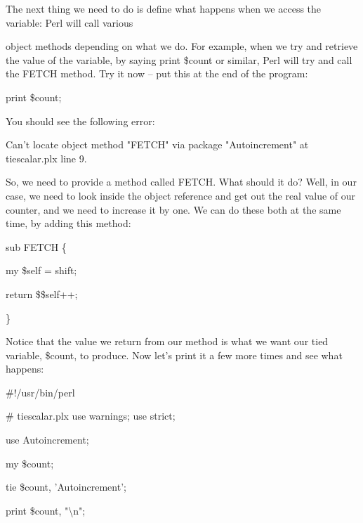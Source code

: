 \documentclass[a4paper,11pt]{book}
\begin{document}
\noindent 

\noindent 

\noindent The next thing we need to do is define what happens when we access the variable: Perl will call various

\noindent object methods depending on what we do. For example, when we try and retrieve the value of the variable, by saying print \$count or similar, Perl will try and call the FETCH method. Try it now -- put this at the end of the program:

\noindent 

\noindent 

\noindent print \$count;

\noindent 

\noindent You should see the following error:

\noindent 

\noindent Can't locate object method "FETCH" via package "Autoincrement" at tiescalar.plx line 9.

\noindent 

\noindent So, we need to provide a method called FETCH. What should it do? Well, in our case, we need to look inside the object reference and get out the real value of our counter, and we need to increase it by one. We can do these both at the same time, by adding this method:

\noindent 

\noindent 

\noindent sub FETCH \{

\noindent my \$self = shift;

\noindent return \$\$self++;

\noindent \}

\noindent 

\noindent Notice that the value we return from our method is what we want our tied variable, \$count, to produce. Now let's print it a few more times and see what happens:

\noindent 

\noindent 

\noindent \#!/usr/bin/perl

\noindent \# tiescalar.plx use warnings; use strict;

\noindent use Autoincrement;

\noindent 

\noindent my \$count;

\noindent tie \$count, 'Autoincrement';

\noindent print \$count, "\textbackslash n";
\end{document}
